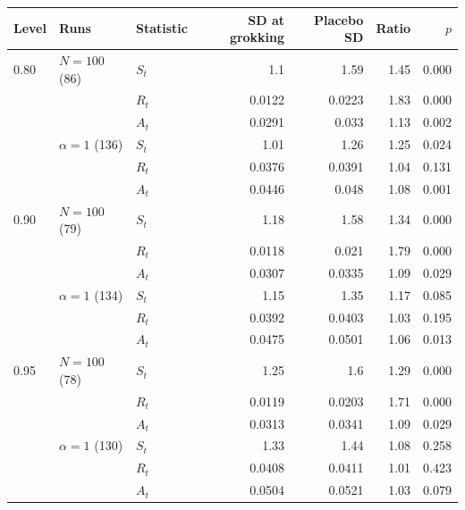\begin{tabular}{lllrrrr}
\toprule
Level & Runs & Statistic & SD at grokking & Placebo SD & Ratio & $p$ \\
\midrule
0.80 & $N=100$ (86) & $S_t$ & 1.1 & 1.59 & 1.45 & 0.000 \\
 &  & $R_t$ & 0.0122 & 0.0223 & 1.83 & 0.000 \\
 &  & $A_t$ & 0.0291 & 0.033 & 1.13 & 0.002 \\
\addlinespace
0.80 & $\alpha=1$ (136) & $S_t$ & 1.01 & 1.26 & 1.25 & 0.024 \\
 &  & $R_t$ & 0.0376 & 0.0391 & 1.04 & 0.131 \\
 &  & $A_t$ & 0.0446 & 0.048 & 1.08 & 0.001 \\
\midrule
0.90 & $N=100$ (79) & $S_t$ & 1.18 & 1.58 & 1.34 & 0.000 \\
 &  & $R_t$ & 0.0118 & 0.021 & 1.79 & 0.000 \\
 &  & $A_t$ & 0.0307 & 0.0335 & 1.09 & 0.029 \\
\addlinespace
0.90 & $\alpha=1$ (134) & $S_t$ & 1.15 & 1.35 & 1.17 & 0.085 \\
 &  & $R_t$ & 0.0392 & 0.0403 & 1.03 & 0.195 \\
 &  & $A_t$ & 0.0475 & 0.0501 & 1.06 & 0.013 \\
\midrule
0.95 & $N=100$ (78) & $S_t$ & 1.25 & 1.6 & 1.29 & 0.000 \\
 &  & $R_t$ & 0.0119 & 0.0203 & 1.71 & 0.000 \\
 &  & $A_t$ & 0.0313 & 0.0341 & 1.09 & 0.029 \\
\addlinespace
0.95 & $\alpha=1$ (130) & $S_t$ & 1.33 & 1.44 & 1.08 & 0.258 \\
 &  & $R_t$ & 0.0408 & 0.0411 & 1.01 & 0.423 \\
 &  & $A_t$ & 0.0504 & 0.0521 & 1.03 & 0.079 \\
\bottomrule
\end{tabular}
